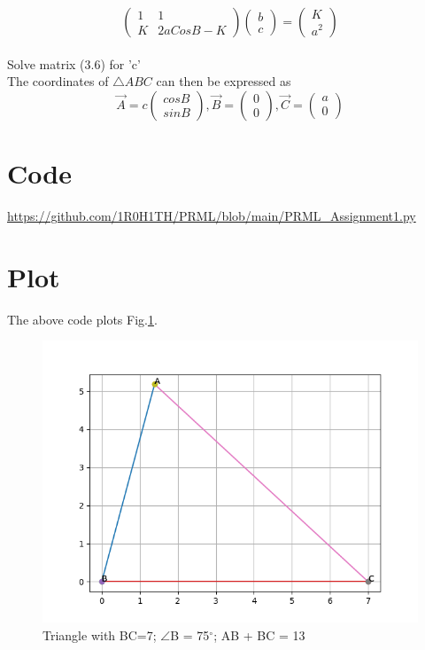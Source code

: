 \documentclass[letterpaper,12pt]{article}
\begin{document}
\begin{equation}
    \begin{pmatrix}
     1 &  1 \\
     K & 2aCosB - K
    \end{pmatrix}
    \begin{pmatrix}
     b \\
     c
    \end{pmatrix}
    =
    \begin{pmatrix}
     K \\
     a^2
    \end{pmatrix}
\end{equation} \\
\vspace{10pt}
Solve matrix (3.6) for 'c' \\
\vspace{10pt}
The coordinates of $\triangle ABC$ can then be expressed as
    \begin{equation}
        \Vec{A} = c
        \begin{pmatrix}
            cos B \\
            sin B
        \end{pmatrix},
        \Vec{B} =
        \begin{pmatrix}
            0 \\
            0
        \end{pmatrix},
        \Vec{C} = 
        \begin{pmatrix}
            a \\
            0
        \end{pmatrix}
    \end{equation}
\section{Code}
\url{https://github.com/1R0H1TH/PRML/blob/main/PRML_Assignment1.py}
\section{Plot}
The above code plots Fig.\ref{fig:direction_vectors}.
\begin{figure}[!ht]
\centering
\includegraphics[width=0.75\columnwidth]{Figure_1.png}
\caption{Triangle with BC=7; $\angle$B = 75$^{\circ}$; AB + BC = 13}
\label{fig:direction_vectors}
\end{figure}
\end{document}
